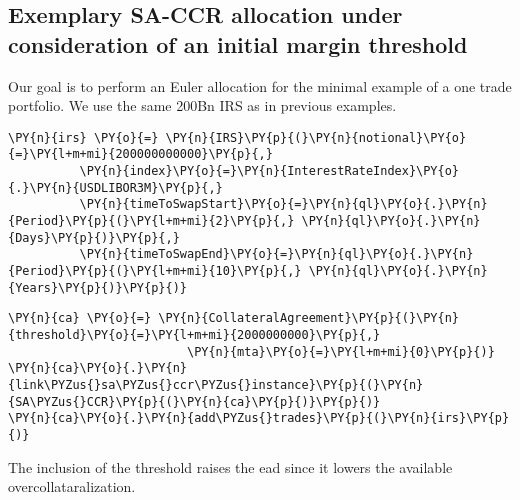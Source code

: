     

    
    \hypertarget{exemplary-sa-ccr-allocation-under-consideration-of-an-initial-margin-threshold}{%
\subsection{Exemplary SA-CCR allocation under consideration of an
initial margin
threshold}\label{exemplary-sa-ccr-allocation-under-consideration-of-an-initial-margin-threshold}}

Our goal is to perform an Euler allocation for the minimal example of a
one trade portfolio. We use the same 200Bn IRS as in previous examples.

    \begin{tcolorbox}[breakable, size=fbox, boxrule=1pt, pad at break*=1mm,colback=cellbackground, colframe=cellborder]
\begin{Verbatim}[commandchars=\\\{\}]
\PY{n}{irs} \PY{o}{=} \PY{n}{IRS}\PY{p}{(}\PY{n}{notional}\PY{o}{=}\PY{l+m+mi}{200000000000}\PY{p}{,}
          \PY{n}{index}\PY{o}{=}\PY{n}{InterestRateIndex}\PY{o}{.}\PY{n}{USDLIBOR3M}\PY{p}{,}
          \PY{n}{timeToSwapStart}\PY{o}{=}\PY{n}{ql}\PY{o}{.}\PY{n}{Period}\PY{p}{(}\PY{l+m+mi}{2}\PY{p}{,} \PY{n}{ql}\PY{o}{.}\PY{n}{Days}\PY{p}{)}\PY{p}{,}
          \PY{n}{timeToSwapEnd}\PY{o}{=}\PY{n}{ql}\PY{o}{.}\PY{n}{Period}\PY{p}{(}\PY{l+m+mi}{10}\PY{p}{,} \PY{n}{ql}\PY{o}{.}\PY{n}{Years}\PY{p}{)}\PY{p}{)}
\end{Verbatim}
\end{tcolorbox}

    \begin{tcolorbox}[breakable, size=fbox, boxrule=1pt, pad at break*=1mm,colback=cellbackground, colframe=cellborder]
\begin{Verbatim}[commandchars=\\\{\}]
\PY{n}{ca} \PY{o}{=} \PY{n}{CollateralAgreement}\PY{p}{(}\PY{n}{threshold}\PY{o}{=}\PY{l+m+mi}{2000000000}\PY{p}{,}
                         \PY{n}{mta}\PY{o}{=}\PY{l+m+mi}{0}\PY{p}{)}
\PY{n}{ca}\PY{o}{.}\PY{n}{link\PYZus{}sa\PYZus{}ccr\PYZus{}instance}\PY{p}{(}\PY{n}{SA\PYZus{}CCR}\PY{p}{(}\PY{n}{ca}\PY{p}{)}\PY{p}{)}
\PY{n}{ca}\PY{o}{.}\PY{n}{add\PYZus{}trades}\PY{p}{(}\PY{n}{irs}\PY{p}{)}
\end{Verbatim}
\end{tcolorbox}

    The inclusion of the threshold raises the ead since it lowers the
available overcollataralization.

